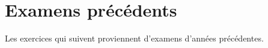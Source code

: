 \section{Examens précédents}

Les exercices qui suivent proviennent d'examens d'années précédentes.



